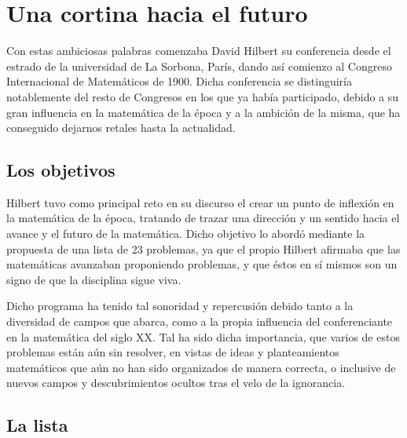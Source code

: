 
\chapter{Una cortina hacia el futuro}\label{ch:Hilbert-1}

Con estas ambiciosas palabras comenzaba David Hilbert su conferencia desde el estrado de la universidad de La Sorbona, París, dando
así comienzo al Congreso Internacional de Matemáticos de 1900.
Dicha conferencia se distinguiría notablemente del resto de Congresos en los que ya había participado, debido a su gran influencia 
en la matemática de la época y a la ambición de la misma, que ha conseguido dejarnos retales hasta la actualidad. 


\section{Los objetivos}

Hilbert tuvo como principal reto en su discurso el crear un punto de inflexión en la matemática de la época, tratando de trazar 
una dirección y un sentido hacia el avance y el futuro de la matemática. Dicho objetivo lo abordó mediante la propuesta de una lista de 
23 problemas, ya que el propio Hilbert afirmaba que las matemáticas avanzaban proponiendo problemas, y que éstos en sí mismos 
son un signo de que la disciplina sigue viva.

Dicho programa ha tenido tal sonoridad y repercusión debido tanto a la diversidad de campos que abarca, como a la propia influencia 
del conferenciante en la matemática del siglo XX. Tal ha sido dicha importancia, que varios de estos problemas están aún sin resolver, 
en vistas de ideas y planteamientos matemáticos que aún no han sido organizados de manera correcta, o inclusive de nuevos campos y 
descubrimientos ocultos tras el velo de la ignorancia.


\section{La lista}

